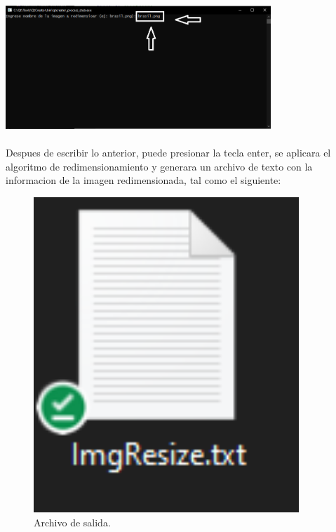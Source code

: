 \documentclass{article}
\begin{document}
\\
\\
\includegraphics[width=10cm]{consola_con_string.PNG}
\\
\\
Despues de escribir lo anterior, puede presionar la tecla enter, se aplicara el algoritmo de redimensionamiento y generara un archivo de texto con la informacion de la imagen redimensionada, tal como el siguiente:
\begin{figure}[h]
  \includegraphics[width=10cm]{salida.PNG}
  \centering
  \caption{Archivo de salida.}
  \label{fig:salida}
\end{figure}
\end{document}
